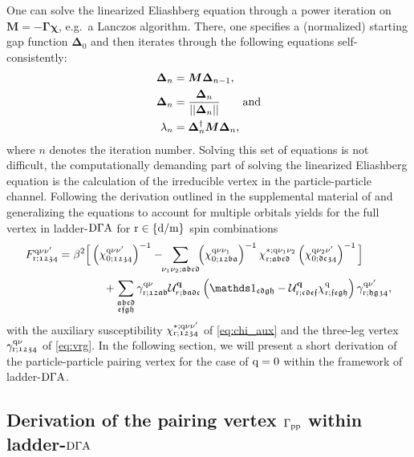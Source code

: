 \documentclass[../../main.tex]{subfiles}
\begin{document}
One can solve the linearized Eliashberg equation through a power iteration on $\bm M = -\bm\Gamma\bm\chi$, e.g.\ a Lanczos algorithm. There, one specifies a (normalized) starting gap function $\bm\Delta_0$ and then iterates through the following equations self-consistently:
\begin{subequations}
\begin{align}
	\bm\Delta_{n} &= \bm M\bm\Delta_{n-1},\\
	\bm\Delta_{n} &= \frac{\bm\Delta_{n}}{||\bm\Delta_{n}||}\qquad\text{and}\\
	\lambda_{n} &= \bm\Delta_{n}^{\dagger}\bm M\bm\Delta_{n},	
\end{align}
\end{subequations}
where $n$ denotes the iteration number. Solving this set of equations is not difficult, the computationally demanding part of solving the linearized Eliashberg equation is the calculation of the irreducible vertex in the particle-particle channel. Following the derivation outlined in the supplemental material of \cite{Kitatani2019} and generalizing the equations to account for multiple orbitals yields for the full vertex in ladder-$\text{D}\Gamma\text{A}$ for $\text{r}\in\{\text{d}/\text{m}\}$ spin combinations
\begin{align}\label{eq:full_vertex_ladder_dga_non_crossing_symmetric}
\begin{split}
	F^{\q\nu\nu'}_{\r;\mathfrak{1234}}&=\beta^2\Big [\left (\chi_{0;\mathfrak{1234}}^{\q\nu\nu'}\right )^{-1}-\!\!\sum_{\nu_1\nu_2;\mathfrak{abcd}}\!\!\left (\chi_{0;\mathfrak{12ba}}^{\q\nu\nu_1}\right )^{-1} \chi_{\r;\mathfrak{abcd}}^{*;\q\nu_1\nu_2} \left (\chi_{0;\mathfrak{dc34}}^{\q\nu_2\nu'}\right )^{-1}\Big ]\\
	&\qquad\qquad + \sum_{\substack{\mathfrak{abcd}\\\mathfrak{efgh}}} \gamma^{\q\nu}_{\r;\mathfrak{12ab}} \mathcal{U}^{\vv{q}}_{r;\mathfrak{badc}}\left (\unity_{\mathfrak{cdgh}}-\mathcal{U}^{\vv{q}}_{\r;\mathfrak{cdef}}\chi^{\q}_{\r;\mathfrak{fegh}}\right )\gamma^{\q\nu'}_{\r;\mathfrak{hg34}}, 
\end{split}
\end{align}
with the auxiliary susceptibility $\chi_{\text{r};\mathfrak{1234}}^{*;\text{q}\nu\nu'}$ of \eqref{eq:chi_aux} and the three-leg vertex $\gamma^{\text{q}\nu}_{\text{r};\mathfrak{1234}}$ of \eqref{eq:vrg}. In the following section, we will present a short derivation of the particle-particle pairing vertex for the case of $\text{q}=0$ within the framework of ladder-$\text{D}\Gamma\text{A}$. 

\subsection{Derivation of the pairing vertex $\Gamma_{\text{pp}}$ within ladder-$\text{D}\Gamma\text{A}$}
\end{document}
